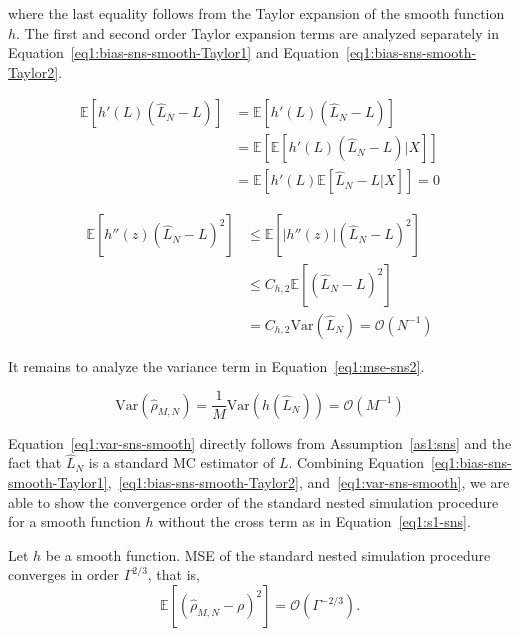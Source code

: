 where the last equality follows from the Taylor expansion of the smooth function $h$.
The first and second order Taylor expansion terms are analyzed separately in Equation~\ref{eq1:bias-sns-smooth-Taylor1} and Equation~\ref{eq1:bias-sns-smooth-Taylor2}.

\begin{align} \label{eq1:bias-sns-smooth-Taylor1}
    \mathbb{E} \left[ h'\left( L \right) \left( \hat{L}_N - L \right) \right]
    & = \mathbb{E} \left[ h'\left( L \right) \left( \hat{L}_N - L \right) \right] \nonumber \\
    & = \mathbb{E} \left[ \mathbb{E} \left[ h'\left( L \right) \left( \hat{L}_N - L \right)  | X \right] \right] \nonumber \\
    & = \mathbb{E} \left[ h'\left( L \right) \mathbb{E} \left[ \hat{L}_N - L  | X \right] \right] = 0
\end{align}

\begin{align} \label{eq1:bias-sns-smooth-Taylor2}
    \mathbb{E} \left[ h''\left( z \right) \left( \hat{L}_N - L \right)^2 \right]
    & \leq \mathbb{E} \left[ |h''\left( z \right)| \left( \hat{L}_N - L \right)^2 \right] \nonumber \\
    & \leq C_{h,2} \mathbb{E} \left[ \left( \hat{L}_N - L \right)^2 \right] \nonumber \\
    & = C_{h,2} \text{Var}(\hat{L}_N) = \mathcal{O}\left( N^{-1} \right)
\end{align}

It remains to analyze the variance term in Equation~\ref{eq1:mse-sns2}.

\begin{equation} \label{eq1:var-sns-smooth}
    \text{Var}(\hat{\rho}_{M, N}) = \frac{1}{M} \text{Var}(h(\hat{L}_N)) = \mathcal{O}(M^{-1})
\end{equation}

Equation~\ref{eq1:var-sns-smooth} directly follows from Assumption~\ref{as1:sns} and the fact that $\hat{L}_N$ is a standard MC estimator of $L$.
Combining Equation~\ref{eq1:bias-sns-smooth-Taylor1},~\ref{eq1:bias-sns-smooth-Taylor2}, and~\ref{eq1:var-sns-smooth}, we are able to show the convergence order of the standard nested simulation procedure for a smooth function $h$ without the cross term as in Equation~\ref{eq1:s1-sns}.

\begin{theorem} \label{thm1:sns-smooth}
    Let $h$ be a smooth function. 
    MSE of the standard nested simulation procedure converges in order $\Gamma^{2/3}$, that is,
    $$\mathbb{E} \left[ \left( \hat{\rho}_{M, N} - \rho \right)^2 \right] = \mathcal{O}(\Gamma^{-2/3}).$$
\end{theorem}

